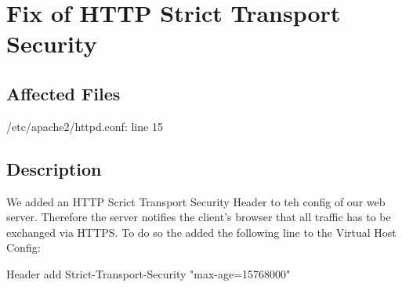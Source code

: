 \chapter{Fix of HTTP Strict Transport Security}
\section{Affected Files}

/etc/apache2/httpd.conf: line 15

\section{Description}

We added an HTTP Scrict Transport Security Header to teh config of our web server. Therefore the server notifies the client's browser that all traffic has to be exchanged via HTTPS.
To do so the added the following line to the Virtual Host Config:

Header add Strict-Transport-Security "max-age=15768000"

